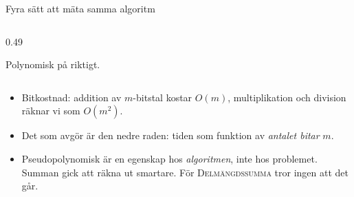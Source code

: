 \documentclass[aspectratio=169,10pt]{beamer}
\newcommand{\prob}[1]{\textsc{#1}}
\begin{document}
\begin{frame}[fragile]{Fyra sätt att mäta samma algoritm}
\begin{columns}[T]
\begin{column}{0.49\textwidth}
\begin{visibleenv}
      \vspace{1mm}
      \textcolor{okgreen}{Polynomisk på riktigt.}
      \end{visibleenv}
    \end{column}
  \end{columns}
  \vspace{2mm}
  \begin{itemize}
    \item<3-> Bitkostnad: addition av $m$-bitstal kostar $O(m)$, multiplikation och division räknar vi som $O(m^2)$.
    \item<4-> Det som avgör är den nedre raden: tiden som funktion av \emph{antalet bitar} $m$.
    \item<5-> Pseudopolynomisk är en egenskap hos \emph{algoritmen}, inte hos problemet. Summan gick att räkna ut smartare. För \prob{Delmängdssumma} tror ingen att det går.
  \end{itemize}
\end{frame}
\end{document}
